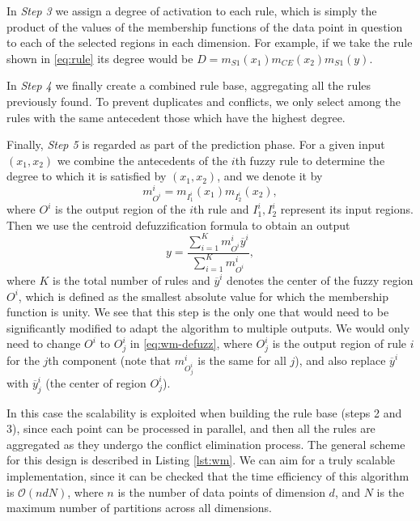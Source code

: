 In \textit{Step 3} we assign a degree of activation to each rule, which is simply the product of the values of the membership functions of the data point in question to each of the selected regions in each dimension. For example, if we take the rule shown in \eqref{eq:rule} its degree would be $D=m_{S1}(x_1)m_{CE}(x_2)m_{S1}(y)$.

In \textit{Step 4} we finally create a combined rule base, aggregating all the rules previously found. To prevent duplicates and conflicts, we only select among the rules with the same antecedent those which have the highest degree.

Finally, \textit{Step 5} is regarded as part of the prediction phase. For a given input $(x_1,x_2)$ we combine the antecedents of the $i$th fuzzy rule to determine the degree to which it is satisfied by $(x_1,x_2)$, and we denote it by
\[
m^i_{O^i} = m_{I_1^i}(x_1)m_{I_2^i}(x_2),
\]
where $O^i$ is the output region of the $i$th rule and $I_1^i, I_2^i$ represent its input regions. Then we use the centroid defuzzification formula to obtain an output
\begin{equation}\label{eq:wm-defuzz}
  y = \dfrac{\displaystyle \sum_{i=1}^K m^i_{O^i}\overbar{y}^i}{\displaystyle \sum_{i=1}^K m^i_{O^i}},
\end{equation}
where $K$ is the total number of rules and $\overbar{y}^i$ denotes the center of the fuzzy region $O^i$, which is defined as the smallest absolute value for which the membership function is unity. We see that this step is the only one that would need to be significantly modified to adapt the algorithm to multiple outputs. We would only need to change $O^i$ to $O^{i}_j$ in \eqref{eq:wm-defuzz}, where $O^{i}_j$ is the output region of rule $i$ for the $j$th component (note that $m^i_{O^i_j}$ is the same for all $j$), and also replace $\overbar{y}^i$ with $\overbar{y}^i_j$ (the center of region $O_j^{i}$).

In this case the scalability is exploited when building the rule base (steps 2 and 3), since each point can be processed in parallel, and then all the rules are aggregated as they undergo the conflict elimination process. The general scheme for this design is described in Listing \ref{lst:wm}. We can aim for a truly scalable implementation, since it can be checked that the time efficiency of this algorithm is $\mathcal O (ndN)$, where $n$ is the number of data points of dimension $d$, and $N$ is the maximum number of partitions across all dimensions.

